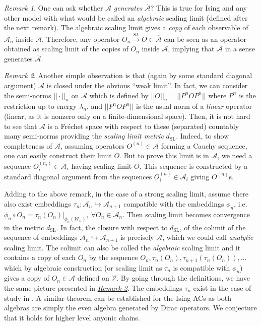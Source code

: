 \documentclass[twoside,11pt,titlepage]{amsart}
\renewcommand{\=}[1]{\stackrel{#1}{=}} %
\theoremstyle{definition}
\theoremstyle{remark}
\newtheorem{rmk}{Remark}
\begin{document}
\begin{rmk}\label{rmk2}
One can ask whether $\mathcal{A}$ \textit{generates} $\overline{\mathcal{A}}$?  This is true for Ising and any other model with what would be called an \textit{algebraic} scaling limit (defined after the next remark). The algebraic scaling limit gives a \textit{copy} of each observable of $\mathcal{A}_n$ inside $\mathcal{A}$. Therefore, any operator $O_n \xrightarrow{SL} O \in \overline{\mathcal{A}}$ can be seen as an operator obtained as scaling limit of the copies of $O_n$ inside $\mathcal{A}$, implying that $\mathcal{A}$ in a sense generates $\overline{\mathcal{A}}$.
\end{rmk}
\begin{rmk}\label{rmk3}
Another simple observation is that (again by some standard diagonal argument) $\mathcal{A}$ is closed under the obvious  ``weak limit''. In fact, we can consider the semi-norms $||\cdot||_n$ on $\mathcal{A}$ which is defined by $||O||_n=||P^nOP^n||$ where $P^n$ is the restriction up to energy $\lambda_n$, and $||P^nOP^n||$ is the usual norm of a \textit{linear} operator (linear, as it is nonzero only on a finite-dimensional space). Then, it is not hard to see that $\mathcal{A}$ is a Fr\'echet space with respect to these (separated) countably many semi-norms providing the \textit{scaling limit metric} $d_{\text{SL}}$. Indeed, to show completeness of $\mathcal{A}$, assuming operators $O^{(n)}\in \mathcal{A}$ forming a Cauchy sequence, one can easily construct their limit $O$. But to prove this limit is in $\mathcal{A}$, we need a sequence $O_{i}^{(n_i)} \in \mathcal{A}_i$ having scaling limit $O$. This sequence is constructed by a standard diagonal argument from the sequences $O^{(n)}_i \in \mathcal{A}_i$ giving $O^{(n)}$s. 
\end{rmk}
Adding to the above remark, in the case of a strong scaling limit, assume there also exist embeddings $\tau_n: \mathcal{A}_n \hookrightarrow \mathcal{A}_{n+1}$ compatible with the embeddings $\phi_n$, i.e. $\phi_n \circ O_n = \tau_n(O_{n})|_{\phi_n(\mathcal{W}_n)}, \ \forall O_n \in  \mathcal{A}_n$. Then scaling limit becomes convergence in the metric $d_{\text{SL}}$. In fact, the closure with respect to $d_{\text{SL}}$, of the colimit of the sequence of embeddings $\mathcal{A}_n \hookrightarrow \mathcal{A}_{n+1}$ is precisely $\mathcal{A}$, which we could call \textit{analytic} scaling limit. The colimit can also be called the \textit{algebraic} scaling limit and it contains a copy of each $O_n$ by the sequence $O_n,\tau_n(O_n),\tau_{n+1}(\tau_n(O_n)),\ldots$ which by algebraic construction (or scaling limit as $\tau_n$ is compatible with $\phi_n$) gives a copy of $O_n \in \mathcal{A}$ defined on $\mathcal{V}$. By going through the definitions, we have the same picture presented in \hyperref[rmk2]{\textit{Remark 2}}. The embeddings $\tau_n$ exist in the case of study in \cite[Theorem 4.4]{gainutdinov2016associative}. A similar theorem can be established for the Ising ACs as both algebras are simply the even algebra generated by Dirac operators. We conjecture that it holds for higher level anyonic chains. 
\end{document}
